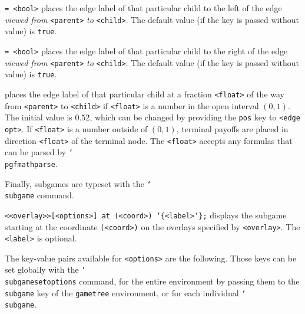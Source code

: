 \documentclass{article}
\newenvironment{desc}{\itemize[leftmargin=50pt]}{\enditemize}
\def\noption#1{\item[\texttt{#1}]}
\def\macroarg#1#2{\item[\cmd{#1}] \hskip-2.5pt\texttt{#2}}
\def\option#1#2{\item[\texttt{#1}] \hskip-1.5pt\texttt{#2}}
\renewcommand{\textbackslash}{\char`\\}
\def\cmd#1{\texttt{\color{cmd}\textbackslash#1}}
\def\leftbrace{\char`\{}
\def\rightbrace{\char`\}}
\def\arg#1{{\color{cmd}\leftbrace}{\color{black}#1}{\color{cmd}\rightbrace}}
\def\optarg[#1]{{\color{player1}[#1]}}
\begin{document}
\begin{desc}
\option{l}{= <bool>} places the edge label of that particular child to the left of the edge \emph{viewed from} \texttt{<parent>} \emph{to} \texttt{<child>}. The default value (if the key is passed without value) is \texttt{true}. 

\option{r}{= <bool>} places the edge label of that particular child to the right of the edge \emph{viewed from} \texttt{<parent>} \emph{to} \texttt{<child>}. The default value (if the key is passed without value) is \texttt{true}.

\noption{<float>} places the edge label of that particular child at a fraction \texttt{<float>} of the way from \texttt{<parent>} to \texttt{<child>} if \texttt{<float>} is a number in the open interval $(0, 1)$. The initial value is $0.52$, which can be changed by providing the \texttt{pos} key to \texttt{<edge opt>}. If \texttt{<float>} is a number outside of $(0, 1)$, terminal payoffs are placed in direction \texttt{<float>} of the terminal node. The \texttt{<float>} accepts any formulas that can be parsed by \cmd{pgfmathparse}.
\end{desc}

\noindent Finally, subgames are typeset with the \cmd{subgame} command.

\begin{desc}
\macroarg{subgame}{<<overlay>>\optarg[<options>] at (<coord>) \arg{<label>};} displays the subgame starting at the coordinate \texttt{(<coord>)} on the overlays specified by \texttt{<overlay>}. The \texttt{<label>} is optional.
\end{desc}

\noindent The key-value pairs available for \texttt{<options>} are the following. Those keys can be set globally with the \cmd{subgamesetoptions} command, for the entire environment by passing them to the \texttt{subgame} key of the \texttt{gametree} environment, or for each individual \cmd{subgame}.
\end{document}
